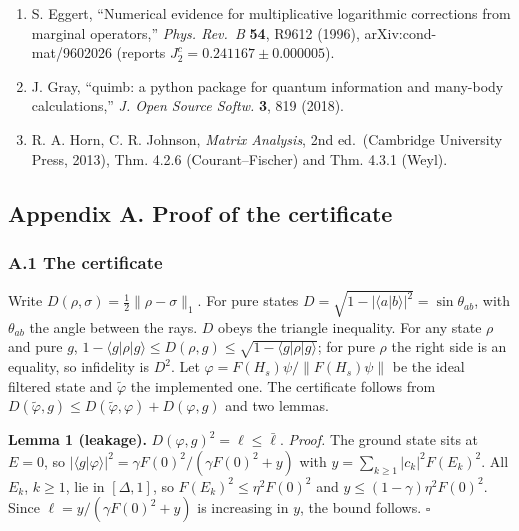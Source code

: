\documentclass[
]{article}
\begin{document}
\begin{enumerate}
  interactions,'' \emph{Phys. Lett. A} \textbf{169}, 433 (1992).
\item
  S. Eggert, ``Numerical evidence for multiplicative logarithmic
  corrections from marginal operators,'' \emph{Phys. Rev.~B}
  \textbf{54}, R9612 (1996), arXiv:cond-mat/9602026 (reports
  \(J_2^c=0.241167\pm0.000005\)).
\item
  J. Gray, ``quimb: a python package for quantum information and
  many-body calculations,'' \emph{J. Open Source Softw.} \textbf{3}, 819
  (2018).
\item
  R. A. Horn, C. R. Johnson, \emph{Matrix Analysis}, 2nd ed.~(Cambridge
  University Press, 2013), Thm. 4.2.6 (Courant--Fischer) and Thm. 4.3.1
  (Weyl).
\end{enumerate}

\hypertarget{appendix-a.-proof-of-the-certificate}{%
\subsection{Appendix A. Proof of the
certificate}\label{appendix-a.-proof-of-the-certificate}}

\hypertarget{a.1-the-certificate}{%
\subsubsection{A.1 The certificate}\label{a.1-the-certificate}}

Write \(D(\rho,\sigma)=\tfrac12\|\rho-\sigma\|_1\). For pure states
\(D=\sqrt{1-|\langle a|b\rangle|^2}=\sin\theta_{ab}\), with
\(\theta_{ab}\) the angle between the rays. \(D\) obeys the triangle
inequality. For any state \(\rho\) and pure \(g\),
\(1-\langle g|\rho|g\rangle\le D(\rho,g)\le\sqrt{1-\langle g|\rho|g\rangle}\);
for pure \(\rho\) the right side is an equality, so infidelity is
\(D^2\). Let \(\varphi=F(H_s)\psi/\|F(H_s)\psi\|\) be the ideal filtered
state and \(\tilde\varphi\) the implemented one. The certificate follows
from \(D(\tilde\varphi,g)\le D(\tilde\varphi,\varphi)+D(\varphi,g)\) and
two lemmas.

\textbf{Lemma 1 (leakage).} \(D(\varphi,g)^2=\ell\le\bar\ell\).
\emph{Proof.} The ground state sits at \(E=0\), so
\(|\langle g|\varphi\rangle|^2=\gamma F(0)^2/(\gamma F(0)^2+y)\) with
\(y=\sum_{k\ge1}|c_k|^2F(E_k)^2\). All \(E_k\), \(k\ge1\), lie in
\([\Delta,1]\), so \(F(E_k)^2\le\eta^2F(0)^2\) and
\(y\le(1-\gamma)\eta^2F(0)^2\). Since \(\ell=y/(\gamma F(0)^2+y)\) is
increasing in \(y\), the bound follows. \(\square\)
\end{document}
